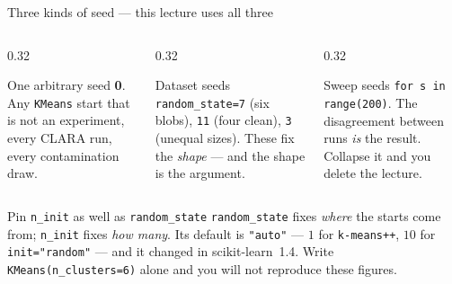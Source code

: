 \documentclass[aspectratio=169]{beamer}
\begin{document}
\begin{frame}[shrink=6]{Three kinds of seed --- this lecture uses all three}
  \begin{columns}[T]
    \begin{column}{0.32\textwidth}
      \begin{block}{One arbitrary seed}
        \small \textbf{0}. Any \texttt{KMeans} start that is not an
        experiment, every CLARA run, every contamination draw.
      \end{block}
    \end{column}
    \begin{column}{0.32\textwidth}
      \begin{block}{Dataset seeds}
        \small \texttt{random\_state=7} (six blobs), \texttt{11} (four
        clean), \texttt{3} (unequal sizes). These fix the \emph{shape} ---
        and the shape is the argument.
      \end{block}
    \end{column}
    \begin{column}{0.32\textwidth}
      \begin{block}{Sweep seeds}
        \small \texttt{for s in range(200)}. The disagreement between runs
        \emph{is} the result. Collapse it and you delete the lecture.
      \end{block}
    \end{column}
  \end{columns}
  \vspace{0.4em}
  \begin{alertblock}{Pin \texttt{n\_init} as well as \texttt{random\_state}}
    \centering\small
    \texttt{random\_state} fixes \emph{where} the starts come from;
    \texttt{n\_init} fixes \emph{how many}. Its default is
    \texttt{"auto"} --- $1$ for \texttt{k-means++}, $10$ for
    \texttt{init="random"} --- and it changed in scikit-learn~1.4. Write
    \texttt{KMeans(n\_clusters=6)} alone and you will not reproduce these
    figures.
  \end{alertblock}
\end{frame}
\end{document}
